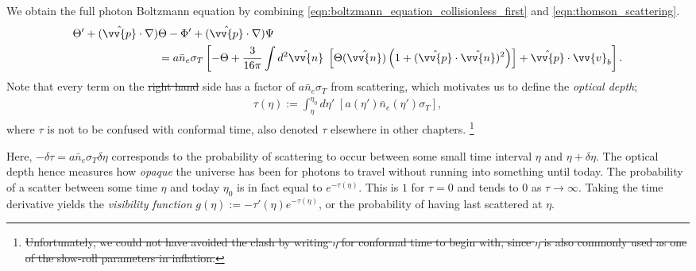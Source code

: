 \documentclass[a4paper,12pt,times,custombib,print,index]{Classes/PhDThesisPSnPDF} %
\providecommand{\DIFadd}[1]{{\protect\color{blue}\uwave{#1}}} %
\providecommand{\DIFdel}[1]{{\protect\color{red}\sout{#1}}}                      %
\providecommand{\DIFaddbegin}{} %
\providecommand{\DIFaddend}{} %
\providecommand{\DIFdelbegin}{} %
\providecommand{\DIFdelend}{} %
\newcommand{\DIFscaledelfig}{0.5}
\newlength{\DIFdelgraphicswidth} %
\newlength{\DIFdelgraphicsheight} %
\newcommand{\DIFaddincludegraphics}[2][]{{\color{blue}\fbox{\DIFOincludegraphics[#1]{#2}}}} %
\newcommand{\DIFdelincludegraphics}[2][]{%
\sbox{\DIFdelgraphicsbox}{\DIFOincludegraphics[#1]{#2}}%
\settoboxwidth{\DIFdelgraphicswidth}{\DIFdelgraphicsbox} %
\settoboxtotalheight{\DIFdelgraphicsheight}{\DIFdelgraphicsbox} %
\scalebox{\DIFscaledelfig}{%
\parbox[b]{\DIFdelgraphicswidth}{\usebox{\DIFdelgraphicsbox}\\[-\baselineskip] \rule{\DIFdelgraphicswidth}{0em}}\llap{\resizebox{\DIFdelgraphicswidth}{\DIFdelgraphicsheight}{%
\setlength{\unitlength}{\DIFdelgraphicswidth}%
\begin{picture}(1,1)%
\thicklines\linethickness{2pt} %
{\color[rgb]{1,0,0}\put(0,0){\framebox(1,1){}}}%
{\color[rgb]{1,0,0}\put(0,0){\line( 1,1){1}}}%
{\color[rgb]{1,0,0}\put(0,1){\line(1,-1){1}}}%
\end{picture}%
}\hspace*{3pt}}} %
} %
\DeclareRobustCommand{\DIFaddbegin}{\DIFOaddbegin \let\includegraphics\DIFaddincludegraphics} %
\DeclareRobustCommand{\DIFaddend}{\DIFOaddend \let\includegraphics\DIFOincludegraphics} %
\DeclareRobustCommand{\DIFdelbegin}{\DIFOdelbegin \let\includegraphics\DIFdelincludegraphics} %
\DeclareRobustCommand{\DIFdelend}{\DIFOaddend \let\includegraphics\DIFOincludegraphics} %
\begin{document}
We obtain the full photon Boltzmann equation by combining \eqref{eqn:boltzmann_equation_collisionless_first} and \eqref{eqn:thomson_scattering}.
\begin{align}
	\Theta' + (\hat{\vv{p}} \cdot \nabla) &\Theta - \Phi' +(\hat{\vv{p}} \cdot \nabla) \Psi  \nonumber \\	
	&= a \bar{n}_e \sigma_T \left[ -\Theta + \frac{3}{16\pi} \int d^2 \hat{\vv{n}} \; \left[ \Theta(\hat{\vv{n}}) \left( 1 + (\hat{\vv{p}} \cdot \hat{\vv{n}})^2 \right) \right] + \hat{\vv{p}} \cdot \vv{v}_b \right]. \label{eqn:boltzmann_equation_1}
\end{align}
Note that every term on the \DIFdelbegin \DIFdel{right hand }\DIFdelend \DIFaddbegin \DIFadd{right-hand }\DIFaddend side has a factor of $a\bar{n}_e \sigma_T$ from scattering, which motivates us to define the \textit{optical depth};
\begin{align}
	\tau(\eta) := \int_\eta^{\eta_0} d\eta'\; \left[ a(\eta') \bar{n}_e (\eta') \sigma_T \right],
\end{align}
where $\tau$ is not to be confused with conformal time, also denoted $\tau$ elsewhere in other chapters. \DIFdelbegin \footnote{\DIFdel{Unfortunately, we could not have avoided the clash by writing $\eta$ for conformal time to begin with, since $\eta$ is also commonly used as one of the slow-roll parameters in inflation.}} %
\addtocounter{footnote}{-1}%
\DIFdelend Here, $-\delta\tau = a\bar{n}_e \sigma_T \delta\eta$ corresponds to the probability of scattering to occur between some small time interval $\eta$ and $\eta+\delta\eta$. The optical depth hence measures how \textit{opaque} the universe has been for photons to travel without running into something until today. The probability of a scatter between some time $\eta$ and today $\eta_0$ is in fact equal to $e^{-\tau(\eta)}$. This is $1$ for $\tau=0$ and tends to $0$ as $\tau\rightarrow\infty$. Taking the time derivative yields the \textit{visibility function} $g(\eta):=-\tau'(\eta) e^{-\tau(\eta)}$, or the probability of having last scattered at $\eta$.
\end{document}
